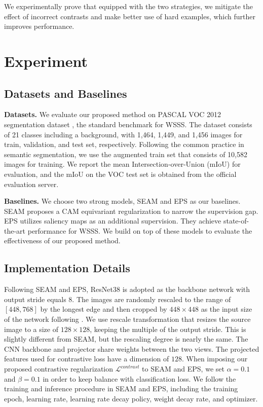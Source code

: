 \documentclass[10pt,twocolumn,letterpaper]{article}
\begin{document}
We experimentally prove that equipped with the two strategies, we mitigate the effect of incorrect contrasts and make better use of hard examples, which further improves performance.


\section{Experiment}
\subsection{Datasets and Baselines}
\textbf{Datasets.} We evaluate our proposed method on PASCAL VOC 2012 segmentation dataset \cite{everingham2010pascalVOC2012}, the standard benchmark for WSSS.
The dataset consists of 21 classes including a background, with 1,464, 1,449, and 1,456 images for train, validation, and test set, respectively. Following the common practice in semantic segmentation, we use the augmented train set that consists of 10,582 images \cite{hariharan2011semanticVOCtrainaug} for training.
We report the mean Intersection-over-Union (mIoU) for evaluation, and the mIoU on the VOC test set is obtained from the official evaluation server. 



\textbf{Baselines.} We choose two strong models, SEAM \cite{wang2020selfSEAM} and EPS \cite{lee2021railroadEPS} as our baselines. SEAM proposes a CAM equivariant regularization to narrow the supervision gap.
EPS utilizes saliency maps as an additional supervision. They achieve state-of-the-art performance for WSSS. 
We build on top of these models to evaluate the effectiveness of our proposed method.

\subsection{Implementation Details}
Following SEAM and EPS, ResNet38 is adopted as the backbone network with output stride equals 8. The images are randomly rescaled to the range of $[448, 768]$ by the longest edge and then cropped by $448 \times 448$ as the input size of the network following \cite{wang2020selfSEAM}.
We use rescale transformation that resizes the source image to a size of $128 \times 128$, keeping the multiple of the output stride. This is slightly different from SEAM, but the rescaling degree is nearly the same. The CNN backbone and projector share weights between the two views. The projected features used for contrastive loss have a dimension of $128$. When imposing our proposed contrastive regularization $\mathcal{L}^{contrast}$ to SEAM and EPS, we set $\alpha = 0.1$ and $\beta=0.1$ in order to keep balance with classification loss.
We follow the training and inference procedure in SEAM and EPS, including the training epoch, learning rate, learning rate decay policy, weight decay rate, and optimizer.
\end{document}
